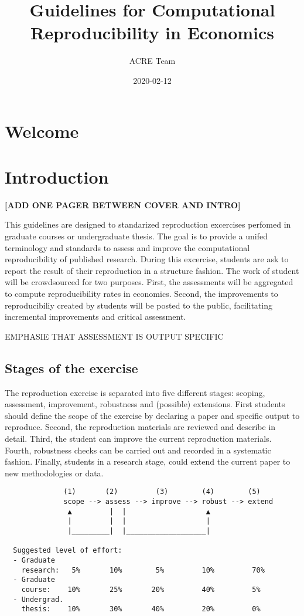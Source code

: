 \documentclass[]{book}
\title{Guidelines for Computational Reproducibility in Economics}
\author{ACRE Team}
\date{2020-02-12}
\begin{document}
\maketitle

{
\setcounter{tocdepth}{1}
\tableofcontents
}
\hypertarget{welcome}{%
\chapter{Welcome}\label{welcome}}

\hypertarget{intro}{%
\chapter{Introduction}\label{intro}}

\textbf{{[}ADD ONE PAGER BETWEEN COVER AND INTRO{]}}

This guidelines are designed to standarized reproduction excercises perfomed in graduate courses or undergraduate thesis.
The goal is to provide a unifed terminology and standards to assess and improve the computational reproducibility of published research.
During this excercise, students are ask to report the result of their reproduction in a structure fashion. The work of student will be
crowdsourced for two purposes. First, the assessments will be aggregated to compute reproducibility rates in economics. Second, the
improvements to reproducibiliy created by students will be posted to the public, facilitating incremental improvements and critical
assessment.

EMPHASIE THAT ASSESSMENT IS OUTPUT SPECIFIC

\hypertarget{stages-of-the-exercise}{%
\section{Stages of the exercise}\label{stages-of-the-exercise}}

The reproduction exercise is separated into five different stages: scoping, assessment, improvement, robustness and (possible) extensions.
First students should define the scope of the exercise by declaring a paper and specific output to reproduce. Second, the reproduction materials
are reviewed and describe in detail. Third, the student can improve the current reproduction materials. Fourth, robustness checks can be carried out
and recorded in a systematic fashion. Finally, students in a research stage, could extend the current paper to new methodologies or data.

\begin{verbatim}
              (1)       (2)         (3)        (4)        (5)
              scope --> assess --> improve --> robust --> extend
               ▲         |  |                   ▲
               |         |  |                   | 
               |_________|  |___________________|

  Suggested level of effort:
  - Graduate
    research:   5%       10%        5%         10%         70%
  - Graduate
    course:    10%       25%       20%         40%         5%
  - Undergrad.
    thesis:    10%       30%       40%         20%         0%
\end{verbatim}
\end{document}
